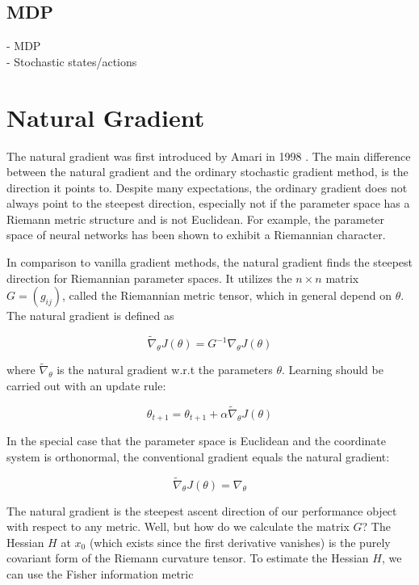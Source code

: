 \subsection{MDP}
- MDP\\
- Stochastic states/actions

\section{Natural Gradient}

The natural gradient was first introduced by Amari in 1998 \cite{amari1998natural}. The main difference between the natural gradient and the ordinary stochastic gradient method, is the direction it points to. Despite many expectations, the ordinary gradient does not always point to the steepest direction, especially not if the parameter space has a Riemann metric structure and is not Euclidean. For example, the parameter space of neural networks has been shown to exhibit a Riemannian character.

In comparison to vanilla gradient methods, the natural gradient finds the steepest direction for Riemannian parameter spaces. It utilizes the $n \times n$ matrix $G = (g_{ij})$, called the Riemannian metric tensor, which in general depend on $\theta$. The natural gradient is defined as

\begin{equation}
	\widetilde{\nabla}_{\theta} J(\theta) = G^{-1} \nabla_\theta J(\theta)
\end{equation}

where $\widetilde{\nabla}_{\theta}$ is the natural gradient w.r.t the parameters $\theta$.  Learning should be carried out with an update rule:

\begin{equation}
	\theta_{t+1} = \theta_{t+1} + \alpha \widetilde{\nabla}_{\theta} J(\theta)
\end{equation}

In the special case that the parameter space is Euclidean and the coordinate system is orthonormal, the conventional gradient equals the natural gradient:

\begin{equation}
	\widetilde{\nabla}_{\theta} J(\theta) = \nabla_{\theta}
\end{equation}

The natural gradient is the steepest ascent direction of our performance object with respect to any metric. Well, but how do we calculate the matrix $G$? The Hessian $H$ at $x_0$ (which exists since the first derivative vanishes) is the purely covariant form of the Riemann curvature tensor. To estimate the Hessian $H$, we can use the Fisher information metric 

